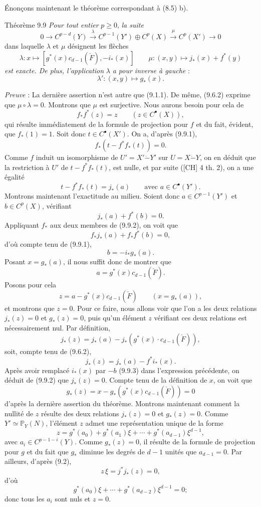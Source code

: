 Énonçons maintenant le théorème correspondant à (8.5) b).

\begin{statement}{Théorème 9.9}
\emph{Pour tout entier} $p\ge0$, \emph{la suite}
\[
0\to C^{p-d}(Y)\xrightarrow{\lambda} C^{p-1}(Y')\oplus C^p(X)\xrightarrow{\mu} C^p(X')\to0
\]
dans laquelle $\lambda$ et $\mu$ désignent les flèches
\[
\lambda:x\mapsto[g^*(x)c_{d-1}(\check F),-i_*(x)]
\qquad
\mu:(x,y)\mapsto j_*(x)+f^*(y)
\]
\emph{est exacte. De plus, l'application} $\lambda$ \emph{a pour inverse à gauche} :
\[
\lambda':(x,y)\mapsto g_*(x).
\]
\end{statement}

\emph{Preuve} : La dernière assertion n'est autre que (9.1.1). De même, (9.6.2) exprime que $\mu\circ\lambda=0$. Montrons que $\mu$ est surjective. Nous aurons besoin pour cela de
\[
f_*f^*(z)=z\qquad(z\in C^{\bullet}(X)),
\tag{9.9.1}
\]
qui résulte immédiatement de la formule de projection pour $f$ et du fait, évident, que $f_*(1)=1$. Soit donc $t\in C^{\bullet}(X')$. On a, d'après (9.9.1),
\[
f_*(t-f^*f_*(t))=0.
\]
Comme $f$ induit un isomorphisme de $U'=X'\mathbin{\dot{-}}Y'$ sur $U=X\mathbin{\dot{-}}Y$, on en déduit que la
restriction à $U'$ de $t-f^*f_*(t)$, est nulle, et par suite ([CH] 4 th. 2), on a une égalité
\[
t-f^*f_*(t)=j_*(a)
\qquad\text{avec }a\in C^{\bullet}(Y').
\]
Montrons maintenant l'exactitude au milieu. Soient donc $a\in C^{p-1}(Y')$ et $b\in C^p(X)$, vérifiant
\[
j_*(a)+f^*(b)=0.
\tag{9.9.2}
\]
Appliquant $f_*$ aux deux membres de (9.9.2), on voit que
\[
f_*j_*(a)+f_*f^*(b)=0,
\]
d'où compte tenu de (9.9.1),
\[
b=-i_*g_*(a).
\tag{9.9.3}
\]
Posant $x=g_*(a)$, il nous suffit donc de montrer que
\[
a=g^*(x)c_{d-1}(\check F).
\tag{9.9.4}
\]
Posons pour cela
\[
z=a-g^*(x)c_{d-1}(\check F)\qquad(x=g_*(a)),
\]
et montrons que $z=0$. Pour ce faire, nous allons voir que l'on a les deux relations $j_*(z)=0$ et $g_*(z)=0$, puis qu'un élément $z$ vérifiant ces deux relations est nécessairement nul. Par définition,
\[
j_*(z)=j_*(a)-j_*(g^*(x)\cdot c_{d-1}(\check F)),
\]
soit, compte tenu de (9.6.2),
\[
j_*(z)=j_*(a)-f^*i_*(x).
\]
Après avoir remplacé $i_*(x)$ par $-b$ (9.9.3) dans l'expression précédente, on déduit de (9.9.2) que $j_*(z)=0$. Compte tenu de la définition de $x$, on voit que
\[
g_*(z)=x-g_*(g^*(x)c_{d-1}(\check F))=0
\]
d'après la dernière assertion du théorème. Montrons maintenant comment la nullité 
de $z$
résulte des deux relations $j_*(z)=0$ et $g_*(z)=0$. Comme $Y'\simeq\mathbb{P}_Y(N)$, l'élément $z$ admet une représentation unique de la forme
\[
z=g^*(a_0)+g^*(a_1)\xi+\cdots+g^*(a_{d-1})\xi^{d-1},
\]
avec $a_i\in C^{p-1-i}(Y)$. Comme $g_*(z)=0$, il résulte de la formule de projection pour $g$ et du fait que $g_*$ diminue les degrés de $d-1$ unités que $a_{d-1}=0$. Par ailleurs, d'après (9.2),
\[
z\,\xi=j^*j_*(z)=0,
\]
d'où
\[
g^*(a_0)\xi+\cdots+g^*(a_{d-2})\xi^{d-1}=0;
\]
donc tous les $a_i$ sont nuls et $z=0$.

